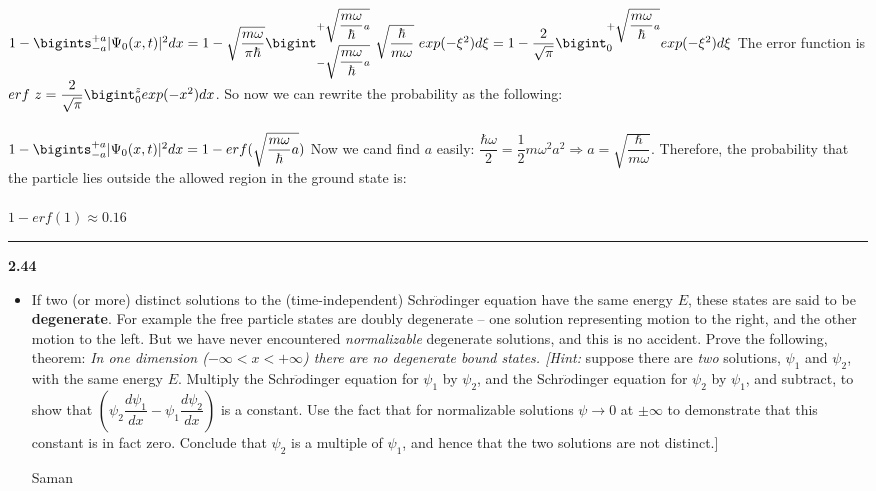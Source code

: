 \documentclass[fleqn]{article}
\begin{document}
\begin{itemize}
{        $
          1-\bigints_{-a}^{+a} |\Psi_0(x,t)|^2 dx=1-\sqrt{\dfrac{m \omega}{\pi \hbar}} \bigint_{-\sqrt{\dfrac{m \omega}{\hbar}a}}^{+\sqrt{\dfrac{m \omega}{\hbar}a}} ~ \sqrt{\dfrac{\hbar}{m \omega}} ~ exp(-\xi^2) d\xi \\
          \\
          \\
          =1-\dfrac{2}{\sqrt{\pi}} \bigint_{0}^{+\sqrt{\dfrac{m \omega}{\hbar}a}} exp(-\xi^2) d\xi \\
          \\
        $
        The error function is $erf ~ z=\dfrac{2}{\sqrt{\pi}} \bigint_{0}^{z} exp(-x^2) dx$. So now we can rewrite 
        the probability as the following: \\
        \\
        $
          1-\bigints_{-a}^{+a} |\Psi_0(x,t)|^2 dx=1-erf(\sqrt{\dfrac{m \omega}{\hbar}a}) \\ \\
        $
        Now we cand find $a$ easily: $\dfrac{\hbar \omega}{2}=\dfrac{1}{2} m \omega^2 a^2 \Longrightarrow a=\sqrt{\dfrac{\hbar}{m \omega}}$.
        Therefore, the probability that the particle lies outside the allowed region in the ground state is: \\
        \\
        $
          1-erf(1) \approx 0.16
        $
      }

  \end{itemize}

  \rule{15cm}{1pt}

  \textbf{2.44}
  \begin{itemize}
    \item If two (or more) distinct solutions to the (time-independent) Schr$\ddot{o}$dinger equation have the
    same energy $E$, these states are said to be \textbf{degenerate}. For example the free particle states are 
    doubly degenerate -- one solution representing motion to the right, and the other motion to the left. But
    we have never encountered \emph{normalizable} degenerate solutions, and this is no accident. Prove the following,
    theorem: \emph{In one dimension ($-\infty < x < +\infty$) there are no degenerate bound states. [Hint:} suppose
    there are \emph{two} solutions, $\psi_1$ and $\psi_2$, with the same energy $E$. Multiply the Schr$\ddot{o}$dinger equation
    for $\psi_1$ by $\psi_2$, and the Schr$\ddot{o}$dinger equation for $\psi_2$ by $\psi_1$, and subtract,
    to show that $\left(\psi_2 \dfrac{d\psi_1}{dx}-\psi_1 \dfrac{d\psi_2}{dx}\right)$ is a constant. Use the 
    fact that for normalizable solutions $\psi \longrightarrow 0$ at $\pm \infty$ to demonstrate that this constant
    is in fact zero. Conclude that $\psi_2$ is a multiple of $\psi_1$, and hence that the two solutions
    are not distinct.]

      \textcolor{hwColor}{
        Saman 
      }

  \end{itemize}
\end{document}
